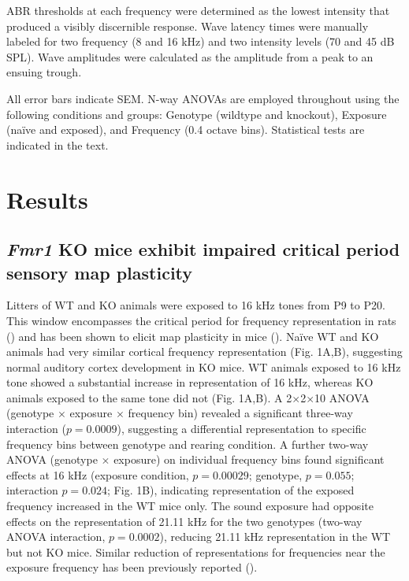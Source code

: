 ABR thresholds at each frequency were determined as the lowest intensity that produced a visibly discernible response. Wave latency times were manually labeled for two frequency (8 and 16 kHz) and two intensity levels (70 and 45 dB SPL). Wave amplitudes were calculated as the amplitude from a peak to an ensuing trough.

All error bars indicate SEM. N-way ANOVAs are employed throughout using the following conditions and groups: Genotype (wildtype and knockout), Exposure (na\"ive and exposed), and Frequency (0.4 octave bins). Statistical tests are indicated in the text.

\section{Results}

\subsection{\textit{Fmr1} KO mice exhibit impaired critical period sensory map plasticity}

Litters of WT and KO animals were exposed to 16 kHz tones from P9 to P20. This window encompasses the critical period for frequency representation in rats (\cite{DeVillers-Sidani2007, Insanally2009}) and has been shown to elicit map plasticity in mice (\cite{Barkat2011}). Na\"ive WT and KO animals had very similar cortical frequency representation (Fig. 1A,B), suggesting normal auditory cortex development in KO mice. WT animals exposed to 16 kHz tone showed a substantial increase in representation of 16 kHz, whereas KO animals exposed to the same tone did not (Fig. 1A,B). A 2$\times$2$\times$10 ANOVA (genotype $\times$ exposure $\times$ frequency bin) revealed a significant three-way interaction ($p=0.0009$), suggesting a differential representation to specific frequency bins between genotype and rearing condition. A further two-way ANOVA (genotype $\times$ exposure) on individual frequency bins found significant effects at 16 kHz (exposure condition, $p=0.00029$; genotype, $p=0.055$; interaction $p=0.024$; Fig. 1B), indicating representation of the exposed frequency increased in the WT mice only. The sound exposure had opposite effects on the representation of 21.11 kHz for the two genotypes (two-way ANOVA interaction, $p=0.0002$), reducing 21.11 kHz representation in the WT but not KO mice. Similar reduction of representations for frequencies near the exposure frequency has been previously reported (\cite{Han2007}).

